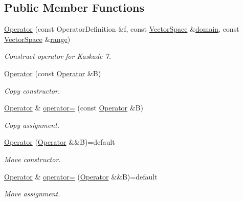 \subsection*{Public Member Functions}
\begin{DoxyCompactItemize}
\item 
\hyperlink{classSpacy_1_1Kaskade_1_1Operator_ac3b217152eeed8b9f786732d300a024e}{Operator} (const Operator\+Definition \&f, const \hyperlink{classSpacy_1_1VectorSpace}{Vector\+Space} \&\hyperlink{classSpacy_1_1OperatorBase_a2588f9b3e0188820c4c494e63293dc6f}{domain}, const \hyperlink{classSpacy_1_1VectorSpace}{Vector\+Space} \&\hyperlink{classSpacy_1_1OperatorBase_ab19d3b7a6f290b1079248f1e567e53d6}{range})
\begin{DoxyCompactList}\small\item\em Construct operator for Kaskade 7. \end{DoxyCompactList}\item 
\hyperlink{classSpacy_1_1Kaskade_1_1Operator_a01164fcd2ea59f951312c37b39ee4f11}{Operator} (const \hyperlink{classSpacy_1_1Kaskade_1_1Operator}{Operator} \&B)
\begin{DoxyCompactList}\small\item\em Copy constructor. \end{DoxyCompactList}\item 
\hyperlink{classSpacy_1_1Kaskade_1_1Operator}{Operator} \& \hyperlink{classSpacy_1_1Kaskade_1_1Operator_a18453c4bbf4040cc0534535ae0b0bbd9}{operator=} (const \hyperlink{classSpacy_1_1Kaskade_1_1Operator}{Operator} \&B)
\begin{DoxyCompactList}\small\item\em Copy assignment. \end{DoxyCompactList}\item 
\hyperlink{classSpacy_1_1Kaskade_1_1Operator_abf7b871f49a8d6dde96c6ed7860820b0}{Operator} (\hyperlink{classSpacy_1_1Kaskade_1_1Operator}{Operator} \&\&B)=default
\begin{DoxyCompactList}\small\item\em Move constructor. \end{DoxyCompactList}\item 
\hyperlink{classSpacy_1_1Kaskade_1_1Operator}{Operator} \& \hyperlink{classSpacy_1_1Kaskade_1_1Operator_a5efe7986ca35ec405f4672ca04ac8349}{operator=} (\hyperlink{classSpacy_1_1Kaskade_1_1Operator}{Operator} \&\&B)=default
\begin{DoxyCompactList}\small\item\em Move assignment. \end{DoxyCompactList}\item 

\end{DoxyCompactItemize}
